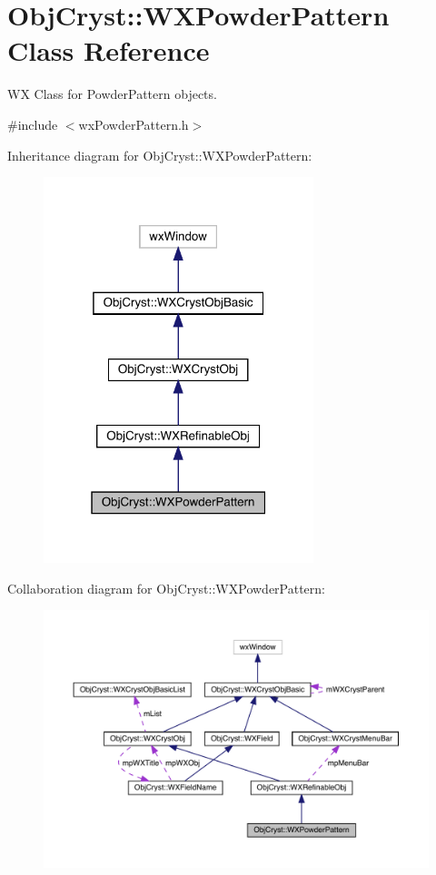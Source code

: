 \hypertarget{class_obj_cryst_1_1_w_x_powder_pattern}{}\section{Obj\+Cryst\+::W\+X\+Powder\+Pattern Class Reference}
\label{class_obj_cryst_1_1_w_x_powder_pattern}


WX Class for Powder\+Pattern objects.  




{\ttfamily \#include $<$wx\+Powder\+Pattern.\+h$>$}



Inheritance diagram for Obj\+Cryst\+::W\+X\+Powder\+Pattern\+:
\nopagebreak
\begin{figure}[H]
\begin{center}
\leavevmode
\includegraphics[width=223pt]{class_obj_cryst_1_1_w_x_powder_pattern__inherit__graph}
\end{center}
\end{figure}


Collaboration diagram for Obj\+Cryst\+::W\+X\+Powder\+Pattern\+:
\nopagebreak
\begin{figure}[H]
\begin{center}
\leavevmode
\includegraphics[width=350pt]{class_obj_cryst_1_1_w_x_powder_pattern__coll__graph}
\end{center}
\end{figure}
